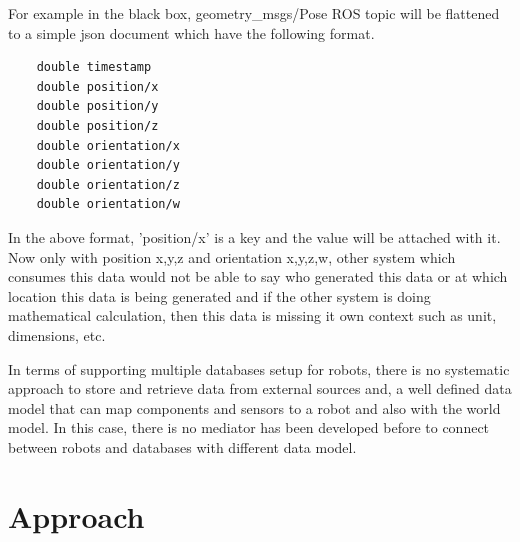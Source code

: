 \documentclass[12pt]{article}
\begin{document}
For example in the black box, geometry\_msgs/Pose ROS topic will be flattened to a simple json document which have the following format.

\begin{lstlisting}
	double timestamp
	double position/x
	double position/y
	double position/z
	double orientation/x
	double orientation/y
	double orientation/z
	double orientation/w
\end{lstlisting}

In the above format, 'position/x' is a key and the value will be attached with it. Now only with position x,y,z and orientation x,y,z,w, other system which consumes this data would not be able to say who generated this data or at which location this data is being generated and if the other system is doing mathematical calculation, then this data is missing it own context such as unit, dimensions, etc.



In terms of supporting multiple databases setup for robots,  there is no systematic approach to store and retrieve data from external sources and, a well defined data model that can map components and sensors to a robot and also with the world model.
In this case, there is no mediator has been developed before to connect between robots and databases with different data model.


\section{Approach}
\end{document}
